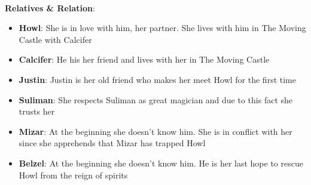 



\\
\textbf{Relatives \& Relation}:
\begin{itemize}
\item \textbf{Howl}: She is in love with him, her partner. She lives with him in The Moving Castle with Calcifer
\item \textbf{Calcifer}: He his her friend and lives with her in The Moving Castle
\item \textbf{Justin}: Justin is her old friend who makes her meet Howl for the first time
\item \textbf{Suliman}: She respects Suliman as great magician and due to this fact she trusts her
\item \textbf{Mizar}: At the beginning she doesn’t know him. She is in conflict with her since she 
apprehends that Mizar has trapped Howl
\item \textbf{Belzel}: At the beginning she doesn’t know him. He is her last hope to rescue Howl from the reign of spirits
\end{itemize}

